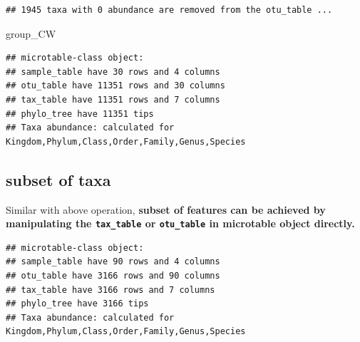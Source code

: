 \documentclass[
]{book}
\newenvironment{Shaded}{\begin{snugshade}}{\end{snugshade}}
\newcommand{\CommentTok}[1]{\textcolor[rgb]{0.56,0.35,0.01}{\textit{#1}}}
\newcommand{\FunctionTok}[1]{\textcolor[rgb]{0.13,0.29,0.53}{\textbf{#1}}}
\newcommand{\NormalTok}[1]{#1}
\newcommand{\OtherTok}[1]{\textcolor[rgb]{0.56,0.35,0.01}{#1}}
\newcommand{\SpecialCharTok}[1]{\textcolor[rgb]{0.81,0.36,0.00}{\textbf{#1}}}
\newcommand{\StringTok}[1]{\textcolor[rgb]{0.31,0.60,0.02}{#1}}
\begin{document}
\begin{verbatim}
## 1945 taxa with 0 abundance are removed from the otu_table ...
\end{verbatim}

\begin{Shaded}
\begin{Highlighting}[]
\NormalTok{group\_CW}
\end{Highlighting}
\end{Shaded}

\begin{verbatim}
## microtable-class object:
## sample_table have 30 rows and 4 columns
## otu_table have 11351 rows and 30 columns
## tax_table have 11351 rows and 7 columns
## phylo_tree have 11351 tips
## Taxa abundance: calculated for Kingdom,Phylum,Class,Order,Family,Genus,Species
\end{verbatim}

\subsection{subset of taxa}\label{subset-of-taxa}

Similar with above operation, \textbf{subset of features can be achieved by manipulating the \texttt{tax\_table} or \texttt{otu\_table} in microtable object directly.}

\begin{Shaded}
\end{Shaded}

\begin{verbatim}
## microtable-class object:
## sample_table have 90 rows and 4 columns
## otu_table have 3166 rows and 90 columns
## tax_table have 3166 rows and 7 columns
## phylo_tree have 3166 tips
## Taxa abundance: calculated for Kingdom,Phylum,Class,Order,Family,Genus,Species
\end{verbatim}
\end{document}
